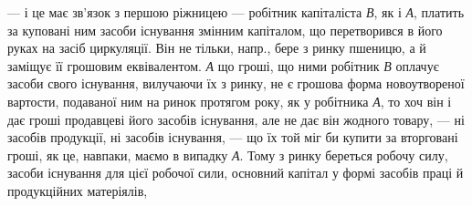  — і це має зв’язок з першою ріжницею — робітник капіталіста
\emph{В}, як і \emph{А}, платить за куповані ним засоби існування змінним
капіталом, що перетворився в його руках на засіб циркуляції. Він не
тільки, напр., бере з ринку пшеницю, а й заміщує її грошовим еквівалентом.
\emph{А} що гроші, що ними робітник \emph{В} оплачує засоби свого існування,
вилучаючи їх з ринку, не є грошова форма новоутвореної вартости,
подаваної ним на ринок протягом року, як у робітника \emph{А}, то хоч
він і дає гроші продавцеві його засобів існування, але не дає він жодного
товару, — ні засобів продукції, ні засобів існування, — що їх той
міг би купити за вторговані гроші, як це, навпаки, маємо в випадку \emph{А}.
Тому з ринку береться робочу силу, засоби існування для цієї робочої
сили, основний капітал у формі засобів праці й продукційних матеріялів,
\parbreak{}  %
